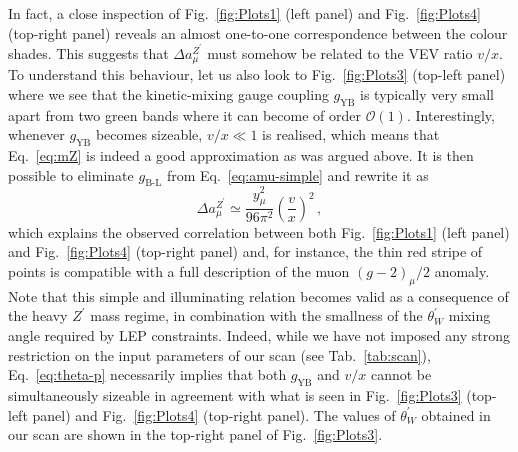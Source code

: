 \documentclass[10pt]{book}
\newcommand{\ro}[1]{\textrm{#1}}
\renewcommand{\(}{\left(}
\renewcommand{\)}{\right)}
\renewcommand{\[}{\left[}
\renewcommand{\]}{\right]}
\begin{document}
In fact, a close inspection of Fig.~\ref{fig:Plots1} (left panel) and Fig.~\ref{fig:Plots4} (top-right panel) reveals an almost one-to-one correspondence between the colour shades. 
This suggests that $\Delta a_{\mu}^{Z^\prime}$ must somehow be related to the VEV ratio $v/x$. 
To understand this behaviour, let us also look to Fig.~\ref{fig:Plots3} (top-left panel) where we see that the kinetic-mixing gauge coupling $g_{\ro{YB}}$ is typically very small apart from two green bands where it can become of order $\mathcal{O}(1)$.
Interestingly, whenever $g_{\ro{YB}}$ becomes sizeable, $v/x \ll 1$ is realised, which means that Eq.~\eqref{eq:mZ} is indeed a good approximation as was argued above. It is then possible to eliminate $g_{\ro{B-L}}$ from Eq.~\eqref{eq:amu-simple} and rewrite it as
\begin{equation}
    \Delta a_\mu^{Z^\prime} \simeq \dfrac{y_\mu^2}{96 \pi^2} \(\dfrac{v}{x}\)^2 \,,
    \label{eq:amu-vev}
\end{equation}
which explains the observed correlation between both Fig.~\ref{fig:Plots1} (left panel) and Fig.~\ref{fig:Plots4} (top-right panel) and, for instance, the thin red stripe of points is compatible with a full description of the muon $\left(g-2\right)_{\mu}/2$ anomaly. Note that this simple and illuminating relation becomes valid as a consequence of the heavy $Z^\prime$ mass regime, in combination with the smallness of the $\theta_{W}^{\prime}$ mixing angle required by LEP constraints. Indeed, while we have not imposed any strong restriction on the input parameters of our scan (see Tab.~\ref{tab:scan}), Eq.~\eqref{eq:theta-p} necessarily implies that both $g_{\ro{YB}}$ and $v/x$ cannot be simultaneously sizeable in agreement with what is seen in Fig.~\ref{fig:Plots3} (top-left panel) and Fig.~\ref{fig:Plots4} (top-right panel). The values of $\theta_W^\prime$ obtained in our scan are shown in the top-right panel of Fig.~\ref{fig:Plots3}.
\end{document}
